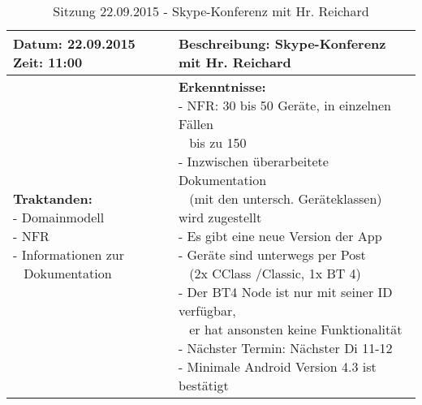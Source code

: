 \begin{table}[H]
\begin{tabularx}{\textwidth}{| l | X |}
\hline
\textbf{Datum:} 22.09.2015
\textbf{Zeit:} 11:00
&
\textbf{Beschreibung:} Skype-Konferenz mit Hr. Reichard \\ \hline
\specialcell[t]{
\textbf{Traktanden:}\\
- Domainmodell\\
- NFR\\
- Informationen zur\\~ Dokumentation\\
}
& 
\specialcell[t]{
\textbf{Erkenntnisse:}\\
- NFR: 30 bis 50 Geräte, in einzelnen Fällen\\~ bis zu 150\\
- Inzwischen überarbeitete Dokumentation\\~ (mit den untersch. Geräteklassen) wird zugestellt\\
- Es gibt eine neue Version der App\\
- Geräte sind unterwegs per Post\\~ (2x CClass /Classic, 1x BT 4)\\
- Der BT4 Node ist nur mit seiner ID verfügbar,\\~ er hat ansonsten keine Funktionalität\\
- Nächster Termin: Nächster Di 11-12\\
- Minimale Android Version 4.3 ist bestätigt\\
}
\\ \hline
\end{tabularx}
\caption{Sitzung 22.09.2015 - Skype-Konferenz mit Hr. Reichard}
\end{table}



